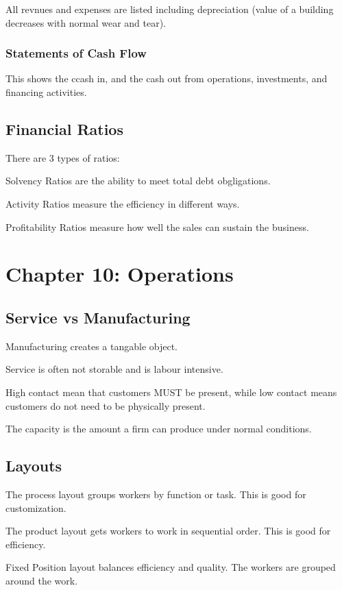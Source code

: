 \documentclass[12pt,letterpaper]{article} \usepackage{amsmath} \usepackage{graphicx} \usepackage[margin=1in]{geometry} \usepackage{longtable}  \usepackage{amssymb}
\begin{document}
 		All revnues and expenses are listed including depreciation (value of a building decreases with normal wear and tear).
		
		\subsubsection{Statements of Cash Flow}
		This shows the ccash in, and the cash out from operations, investments, and financing activities. 
		
		\subsection{Financial Ratios}
		There are 3 types of ratios:
		
		Solvency Ratios are the ability to meet total debt obgligations. 
		
		Activity Ratios measure the efficiency in different ways. 
		
		Profitability Ratios measure how well the sales can sustain the business. 
		
		\section{Chapter 10: Operations}
		
		\subsection{Service vs Manufacturing}
		Manufacturing creates a tangable object. 
		
		Service is often not storable and is labour intensive. 
		
		High contact mean that customers MUST be present, while low contact means customers do not need to be physically present. 
		
		The capacity is the amount a firm can produce under normal conditions. 
		
		\subsection{Layouts}
		The process layout groups workers by function or task. This is good for customization.
		
		The product layout gets workers to work in sequential order. This is good for efficiency.
		
		Fixed Position layout balances efficiency and quality. The workers are grouped around the work. 
		
\end{document}

